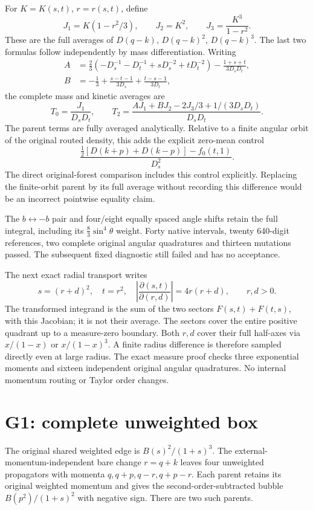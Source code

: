 \documentclass[11pt]{article}
\begin{document}
For $K=K(s,t)$, $r=r(s,t)$, define
\[
 J_1=K(1-r^2/3),\qquad J_2=K^2,\qquad J_3=\frac{K^3}{1-r^2}.
\]
These are the full averages of $D(q-k)$, $D(q-k)^2$, $D(q-k)^3$.
The last two formulas follow independently by mass differentiation.
Writing
\begin{align*}
 A&=\frac23\left(-D_s^{-1}-D_t^{-1}+sD_s^{-2}+tD_t^{-2}\right)
       -\frac{1+s+t}{3D_sD_t},\\
 B&=-\frac13+\frac{s-t-1}{3D_s}+\frac{t-s-1}{3D_t},
\end{align*}
the complete mass and kinetic averages are
\[
 T_0=\frac{J_1}{D_sD_t},\qquad
 T_2=\frac{A J_1+B J_2-2J_3/3+1/(3D_sD_t)}{D_sD_t}.
\]
The parent terms are fully averaged analytically. Relative to a finite
angular orbit of the original routed density, this adds the explicit
zero-mean control
\[
 \frac{\tfrac12[D(k+p)+D(k-p)]-f_0(t,1)}{D_s^2}.
\]
The direct original-forest comparison includes this control explicitly.
Replacing the finite-orbit parent by its full average without recording
this difference would be an incorrect pointwise equality claim.

The $b\leftrightarrow-b$ pair and four/eight equally spaced angle shifts
retain the full integral, including its $\tfrac83\sin^4\theta$ weight.
Forty native intervals, twenty 640-digit references, two complete
original angular quadratures and thirteen mutations passed.
The subsequent fixed diagnostic still failed and has no acceptance.

The next exact radial transport writes
\[
 s=(r+d)^2,\quad t=r^2,\quad
 \left|\frac{\partial(s,t)}{\partial(r,d)}\right|=4r(r+d),
 \qquad r,d>0.
\]
The transformed integrand is the sum of the two sectors $F(s,t)+F(t,s)$,
with this Jacobian; it is not their average. The sectors cover the entire
positive quadrant up to a measure-zero boundary. Both $r,d$ cover their
full half-axes via $x/(1-x)$ or $x/(1-x)^3$. A finite radius difference
is therefore sampled directly even at large radius. The exact measure
proof checks three exponential moments and sixteen independent original
angular quadratures. No internal momentum routing or Taylor order changes.

\section*{G1: complete unweighted box}
The original shared weighted edge is $B(s)^2/(1+s)^3$.
The external-momentum-independent bare change $r=q+k$ leaves four
unweighted propagators with momenta $q,q+p,q-r,q+p-r$.
Each parent retains its original weighted momentum and gives the
second-order-subtracted bubble $B(p^2)/(1+s)^2$ with negative sign.
There are two such parents.
\end{document}
